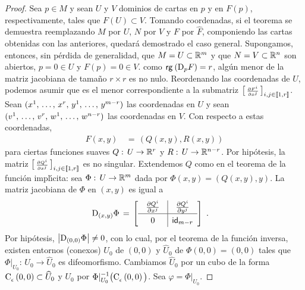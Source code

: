 \begin{proof}
	Sea $p\in M$ y sean $U$ y $V$ dominios de cartas en $p$ y en $F(p)$,
	respectivamente, tales que $F(U)\subset V$. Tomando coordenadas, si
	el teorema se demuestra reemplazando $M$ por $U$, $N$ por $V$ y
	$F$ por $\widehat{F}$, componiendo las cartas obtenidas con las
	anteriores, quedar\'{a} demostrado el caso general. Supongamos,
	entonces, sin p\'{e}rdida de generalidad, que $M=U\subset\bb{R}^{m}$
	y que $N=V\subset\bb{R}^{n}$ son abiertos, $p=0\in U$ y
	$F(p)=0\in V$. como $\rango{\jacobiana[p]{F}}=r$, alg\'{u}n menor
	de la matriz jacobiana de tama\~{n}o $r\times r$ es no nulo.
	Reordenando las coordenadas de $U$, podemos asumir que es el menor
	correspondiente a la submatriz
	\begin{math}
		\left[\begin{smallmatrix}
			\derivada{F^{i}}{x^{j}}
		\end{smallmatrix}\right]_{i,j\in[\![1,r]\!]}
	\end{math}.
	Sean $(\lista*{x}{r},\,\lista*{y}{m-r})$ las coordenadas en $U$ y
	sean $(\lista*{v}{r},\,\lista*{w}{n-r})$ las coordenadas en $V$. Con
	respecto a estas coordenadas,
	\begin{align*}
		F(x,y) & \,=\, (Q(x,y),R(x,y))
	\end{align*}
	para ciertas funciones suaves $Q:\,U\rightarrow\bb{R}^{r}$ y
	$R:\,U\rightarrow\bb{R}^{n-r}$. Por hip\'{o}tesis, la matriz
	\begin{math}
		\left[\begin{smallmatrix}
			\derivada{Q^{i}}{x^{j}}
		\end{smallmatrix}\right]_{i,j\in[\![1,r]\!]}
	\end{math}
	es no singular. Extendemos $Q$ como en el teorema de la funci\'{o}n
	impl\'{\i}cita: sea $\Phi:\,U\rightarrow\bb{R}^{m}$ dada por
	$\Phi(x,y)=(Q(x,y),y)$. La matriz jacobiana de $\Phi$ en $(x,y)$ es
	igual a
	\begin{align*}
		\jacobiana[(x,y)]{\Phi} & \,=\,
		\sbox0{$
		\id[m-r]
		$}
		\sbox1{$
		\derivada{Q^{i}}{y^{j}}
		$}
		\left[
		\begin{array}{c|c}
			\makebox[\wd0]{$\derivada{Q^{i}}{x^{j}}$} &
				\usebox{1} \\
			\hline
			\vphantom{\usebox{1}}\makebox[\wd0]{$0$} &
				\usebox{0}
		\end{array}
		\right]
		\text{ .}
	\end{align*}
	Por hip\'{o}tesis, $\left|\jacobiana[(0,0)]{\Phi}\right|\not =0$,
	con lo cual, por el teorema de la funci\'{o}n inversa, existen
	entornos (conexos) $U_{0}$ de $(0,0)$ y $\widehat{U}_{0}$ de
	$\Phi(0,0)=(0,0)$ tales que $\Phi|_{U_{0}}:\,%
	U_{0}\rightarrow\widehat{U}_{0}$ es difeomorfismo. Cambiamos
	$\widehat{U}_{0}$ por un cubo de la forma
	$\cubo{\epsilon}{0,0}\subset\widehat{U}_{0}$ y $U_{0}$ por
	$\Phi|_{U_{0}}^{-1}\big(\cubo{\epsilon}{0,0}\big)$. Sea
	$\varphi=\Phi|_{U_{0}}$.


\end{proof}
